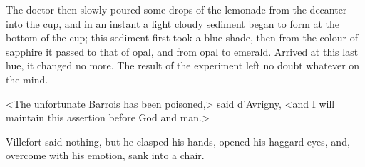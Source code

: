  The doctor then slowly poured some drops of the lemonade from the decanter into the cup, and in an instant a light cloudy sediment began to form at the bottom of the cup; this sediment first took a blue shade, then from the colour of sapphire it passed to that of opal, and from opal to emerald. Arrived at this last hue, it changed no more. The result of the experiment left no doubt whatever on the mind. 

 <The unfortunate Barrois has been poisoned,> said d'Avrigny, <and I will maintain this assertion before God and man.> 

 Villefort said nothing, but he clasped his hands, opened his haggard eyes, and, overcome with his emotion, sank into a chair. 